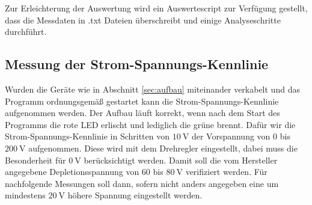 Zur Erleichterung der Auswertung wird ein Auswertescript zur Verfügung gestellt, dass die Messdaten in .txt Dateien überschreibt und einige Analyseschritte durchführt.

\subsection{Messung der Strom-Spannungs-Kennlinie}

Wurden die Geräte wie in Abschnitt \ref{sec:aufbau} miteinander verkabelt und das Programm ordnungsgemäß gestartet kann die Strom-Spannungs-Kennlinie aufgenommen werden.
Der Aufbau läuft korrekt, wenn nach dem Start des Programms die rote LED erlischt und lediglich die grüne brennt.
Dafür wir die Strom-Spannungs-Kennlinie in Schritten von $\SI{10}{\volt}$ der Vorspannung von 0 bis $\SI{200}{\volt}$ aufgenommen.
Diese wird mit dem Drehregler eingestellt, dabei muss die Besonderheit für $\SI{0}{\volt}$ berücksichtigt werden.
Damit soll die vom Hersteller angegebene Depletionsspannung von 60 bis $\SI{80}{\volt}$ verifiziert werden.
Für nachfolgende Messungen soll dann, sofern nicht anders angegeben eine um mindestens $\SI{20}{\volt}$ höhere Spannung eingestellt werden.
